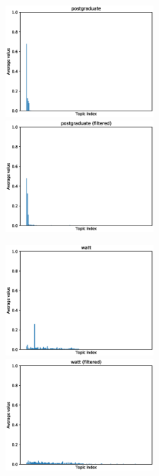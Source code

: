 \begin{figure}[ht]
    \centering
    \includegraphics[width=0.5\textwidth]{images/similarity_graphs/non-filtered/postgraduate.eps}%
    \hfill
    \includegraphics[width=0.5\textwidth]{images/similarity_graphs/filtered/postgraduate.eps}
\end{figure}

\pagebreak
\begin{figure}[ht]
    \centering
    \includegraphics[width=0.5\textwidth]{images/similarity_graphs/non-filtered/watt.eps}%
    \hfill
    \includegraphics[width=0.5\textwidth]{images/similarity_graphs/filtered/watt.eps}
\end{figure}

